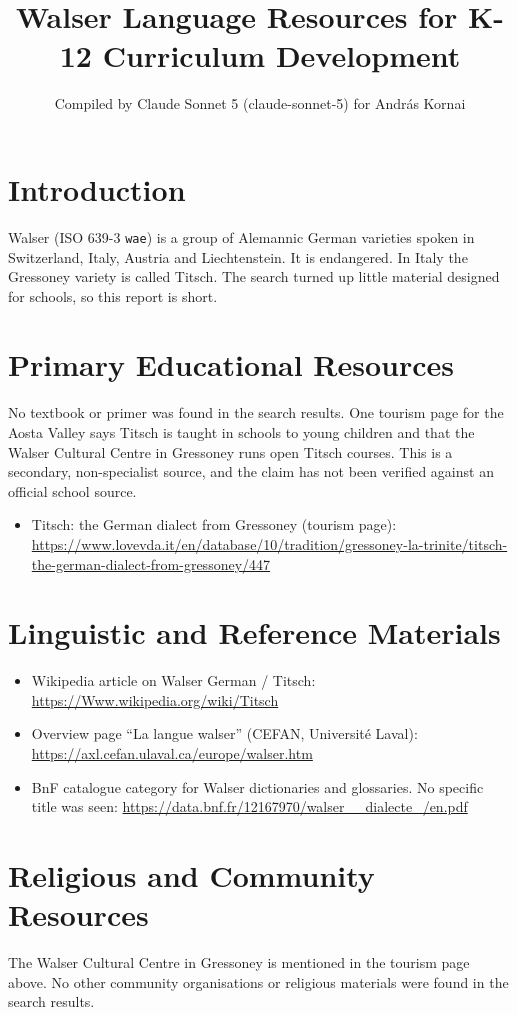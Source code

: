 \documentclass[12pt]{article}
\title{Walser Language Resources for K-12 Curriculum Development}
\author{Compiled by Claude Sonnet 5 (claude-sonnet-5) for Andr\'as Kornai}
\date{}
\begin{document}
\maketitle

\section{Introduction}
Walser (ISO 639-3 \texttt{wae}) is a group of Alemannic German varieties spoken in Switzerland, Italy, Austria and Liechtenstein. It is endangered. In Italy the Gressoney variety is called Titsch. The search turned up little material designed for schools, so this report is short.

\section{Primary Educational Resources}
No textbook or primer was found in the search results. One tourism page for the Aosta Valley says Titsch is taught in schools to young children and that the Walser Cultural Centre in Gressoney runs open Titsch courses. This is a secondary, non-specialist source, and the claim has not been verified against an official school source.
\begin{itemize}
\item Titsch: the German dialect from Gressoney (tourism page): \url{https://www.lovevda.it/en/database/10/tradition/gressoney-la-trinite/titsch-the-german-dialect-from-gressoney/447}
\end{itemize}

\section{Linguistic and Reference Materials}
\begin{itemize}
\item Wikipedia article on Walser German / Titsch: \url{https://Www.wikipedia.org/wiki/Titsch}
\item Overview page ``La langue walser'' (CEFAN, Universit\'e Laval): \url{https://axl.cefan.ulaval.ca/europe/walser.htm}
\item BnF catalogue category for Walser dictionaries and glossaries. No specific title was seen: \url{https://data.bnf.fr/12167970/walser__dialecte_/en.pdf}
\end{itemize}

\section{Religious and Community Resources}
The Walser Cultural Centre in Gressoney is mentioned in the tourism page above. No other community organisations or religious materials were found in the search results.
\end{document}
